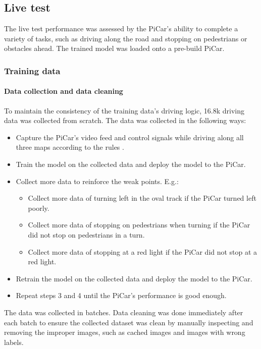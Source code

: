 \documentclass{article}
\begin{document}
\subsection{Live test}
The live test performance was assessed by the PiCar's ability to complete a variety of tasks, such as driving along the road and stopping on pedestrians or obstacles ahead. The trained model was loaded onto a pre-build PiCar. 

\subsubsection{Training data}

\paragraph{Data collection and data cleaning}
To maintain the consistency of the training data's driving logic, 16.8k driving data was collected from scratch. The data was collected in the following ways:
\begin{itemize}
  \item Capture the PiCar's video feed and control signals while driving along all three maps according to the rules \citep{Kaggle}.
  \item Train the model on the collected data and deploy the model to the PiCar.
  \item Collect more data to reinforce the weak points. E.g.: 
  \begin{itemize}
    \item Collect more data of turning left in the oval track if the PiCar turned left poorly.
    \item Collect more data of stopping on pedestrians when turning if the PiCar did not stop on pedestrians in a turn.
    \item Collect more data of stopping at a red light if the PiCar did not stop at a red light.
  \end{itemize} 
  \item Retrain the model on the collected data and deploy the model to the PiCar.
  \item Repeat steps 3 and 4 until the PiCar's performance is good enough.
\end{itemize}

The data was collected in batches. Data cleaning was done immediately after each batch to ensure the collected dataset was clean by manually inspecting and removing the improper images, such as cached images and images with wrong labels. 
\end{document}
